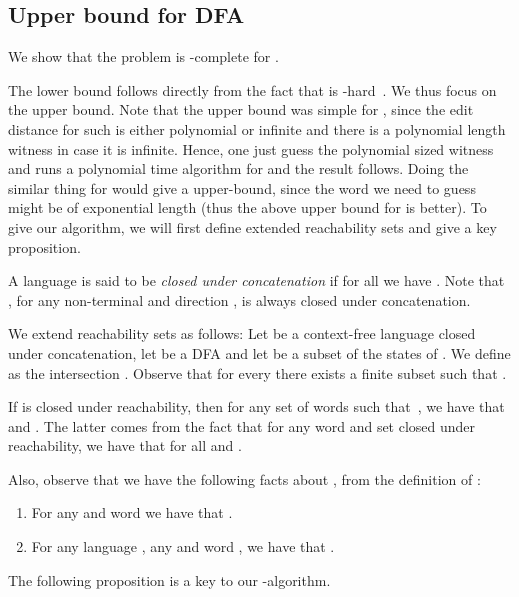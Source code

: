 \documentclass{CSML}
\begin{document}
\subsection{Upper bound for DFA}
\label{sec:FEDUpperBoundDFA}

We show that the problem  is -complete for .


\smallskip{}
The lower bound follows directly from the fact that  is -hard~\cite{boundedRiveros}. We thus focus on the upper bound. Note that the upper bound was simple for , since the edit distance for such is either polynomial or infinite and there is a polynomial length witness in case it is infinite. Hence, one just guess the polynomial sized witness~ and runs a polynomial time algorithm for  and the result follows. Doing the similar thing for  would give a  upper-bound, since the word we need to guess might be of exponential length (thus the above  upper bound for  is better). To give our algorithm, we will first define extended reachability sets and give a key proposition.

\smallskip{}
A language  is said to be {\em closed under concatenation} if for all  we have . Note that , for any non-terminal  and direction , is always closed under concatenation.

We extend reachability sets as follows:
Let  be a context-free language closed under concatenation, let  be a DFA and let  be a subset of the states of .
We define  as the intersection . 
Observe that for every  there exists a finite subset  such that .

\begin{rem}\label{rem:R_set}
 If  is closed under reachability, then for any set
  of words such that~, we have that  and  . The latter comes from the fact that for any word  and set  closed under reachability, we have that  for all  and . 
 
Also, observe that we have the following facts about , from the definition of :
\begin{enumerate}
\item For any  and word  we have that .
\item For any language , any  and word , we have that .
\end{enumerate}
  \label{rem:exists_word_equal_to_L}
\end{rem}

The following proposition is a key to our -algorithm.
\end{document}
